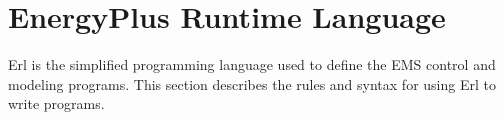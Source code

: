 \chapter{EnergyPlus Runtime Language}\label{energyplus-runtime-language}

Erl is the simplified programming language used to define the EMS control and modeling programs. This section describes the rules and syntax for using Erl to write programs.
